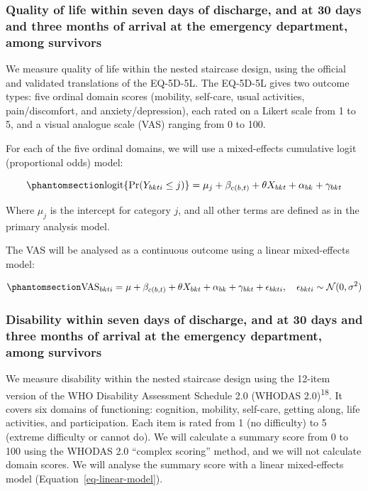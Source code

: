 \documentclass[
]{scrartcl}
\begin{document}
\subsubsection{Quality of life within seven days of discharge, and at 30
days and three months of arrival at the emergency department, among
survivors}\label{sec-quality-of-life-within-seven-days-of-discharge-and-at-30-days-and-three-months-of-arrival-at-the-emergency-department-among-survivors}

We measure quality of life within the nested staircase design, using the
official and validated translations of the EQ-5D-5L. The EQ-5D-5L gives
two outcome types: five ordinal domain scores (mobility, self-care,
usual activities, pain/discomfort, and anxiety/depression), each rated
on a Likert scale from 1 to 5, and a visual analogue scale (VAS) ranging
from 0 to 100.

For each of the five ordinal domains, we will use a mixed-effects
cumulative logit (proportional odds) model:

\begin{equation}\phantomsection\label{eq-ordinal-model}{
\text{logit}\{\Pr(Y_{bkti} \leq j)\}
= \mu_j + \beta_{c(b,t)} + \theta X_{bkt} + \alpha_{bk} + \gamma_{bkt}
}\end{equation}

Where \(\mu_j\) is the intercept for category \(j\), and all other terms
are defined as in the primary analysis model.

The VAS will be analysed as a continuous outcome using a linear
mixed-effects model:

\begin{equation}\phantomsection\label{eq-linear-model}{
\text{VAS}_{bkti}
= \mu + \beta_{c(b,t)} + \theta X_{bkt} + \alpha_{bk} + \gamma_{bkt} + \epsilon_{bkti},
\quad \epsilon_{bkti} \sim \mathcal{N}(0,\sigma^2)
}\end{equation}

\subsubsection{Disability within seven days of discharge, and at 30 days
and three months of arrival at the emergency department, among
survivors}\label{sec-disability-within-seven-days-of-discharge-and-at-30-days-and-three-months-of-arrival-at-the-emergency-department-among-survivors}

We measure disability within the nested staircase design using the
12-item version of the WHO Disability Assessment Schedule 2.0 (WHODAS
2.0)\textsuperscript{18}. It covers six domains of functioning:
cognition, mobility, self-care, getting along, life activities, and
participation. Each item is rated from 1 (no difficulty) to 5 (extreme
difficulty or cannot do). We will calculate a summary score from 0 to
100 using the WHODAS 2.0 ``complex scoring'' method, and we will not
calculate domain scores. We will analyse the summary score with a linear
mixed-effects model (Equation~\ref{eq-linear-model}).
\end{document}
